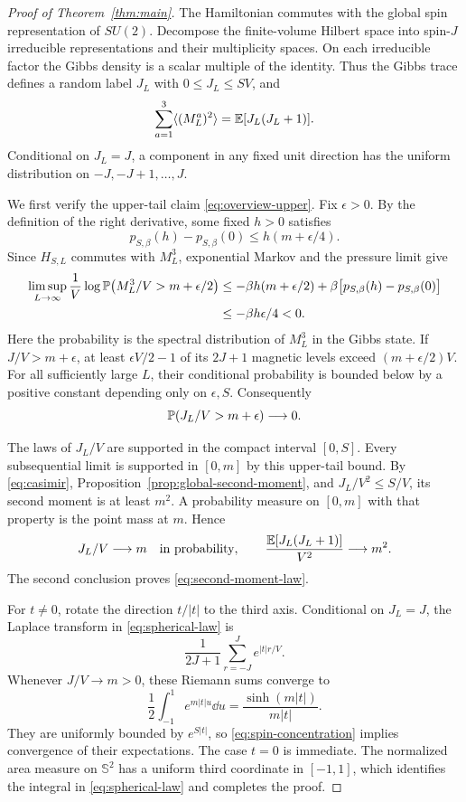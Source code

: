 \begin{proof}[Proof of Theorem~\ref{thm:main}]
The Hamiltonian commutes with the global spin representation of
$SU(2)$. Decompose the finite-volume Hilbert space into spin-$J$
irreducible representations and their multiplicity spaces. On each
irreducible factor the Gibbs density is a scalar multiple of the
identity. Thus the Gibbs trace defines a random label $J_L$ with
$0\le J_L\le SV$, and
\begin{equation}\label{eq:casimir}
 \sum_{a=1}^3\langle(M_L^a)^2\rangle
       =\mathbb E[J_L(J_L+1)].
\end{equation}
Conditional on $J_L=J$, a component in any fixed unit direction has the
uniform distribution on $-J,-J+1,\ldots,J$.

We first verify the upper-tail claim \eqref{eq:overview-upper}. Fix
$\epsilon>0$. By the definition of the right derivative, some fixed
$h>0$ satisfies
\[
 p_{S,\beta}(h)-p_{S,\beta}(0)
       \le h(m+\epsilon/4).
\]
Since $H_{S,L}$ commutes with $M_L^3$, exponential Markov and the pressure
limit give
\begin{align*}
 \limsup_{L\to\infty}\frac1V
   \log\mathbb P\bigl(M_L^3/V>m+\epsilon/2\bigr)
 &\le -\beta h(m+\epsilon/2)
       +\beta\bigl[p_{S,\beta}(h)-p_{S,\beta}(0)\bigr] \\
 &\le -\beta h\epsilon/4<0.
\end{align*}
Here the probability is the spectral distribution of $M_L^3$ in the
Gibbs state. If $J/V>m+\epsilon$, at least $\epsilon V/2-1$ of its
$2J+1$ magnetic levels exceed $(m+\epsilon/2)V$. For all sufficiently
large $L$, their conditional probability is bounded below by a positive
constant depending only on $\epsilon,S$. Consequently
\[
 \mathbb P(J_L/V>m+\epsilon)\longrightarrow0.
\]

The laws of $J_L/V$ are supported in the compact interval $[0,S]$.
Every subsequential limit is supported in $[0,m]$ by this upper-tail
bound. By \eqref{eq:casimir}, Proposition~\ref{prop:global-second-moment},
and $J_L/V^2\le S/V$, its second moment is at least $m^2$. A probability
measure on $[0,m]$ with that property is the point mass at $m$. Hence
\begin{equation}\label{eq:spin-concentration}
 J_L/V\longrightarrow m\quad\text{in probability},
 \qquad
 \frac{\mathbb E[J_L(J_L+1)]}{V^2}\longrightarrow m^2.
\end{equation}
The second conclusion proves \eqref{eq:second-moment-law}.

For $t\ne0$, rotate the direction $t/|t|$ to the third axis. Conditional
on $J_L=J$, the Laplace transform in \eqref{eq:spherical-law} is
\[
 \frac1{2J+1}\sum_{r=-J}^{J}e^{|t|r/V}.
\]
Whenever $J/V\to m>0$, these Riemann sums converge to
\[
 \frac12\int_{-1}^1e^{m|t|u}\dd u
       =\frac{\sinh(m|t|)}{m|t|}.
\]
They are uniformly bounded by $e^{S|t|}$, so
\eqref{eq:spin-concentration} implies convergence of their expectations.
The case $t=0$ is immediate. The normalized area measure on
$\mathbb S^2$ has a uniform third coordinate in $[-1,1]$, which identifies
the integral in \eqref{eq:spherical-law} and completes the proof.
\end{proof}

